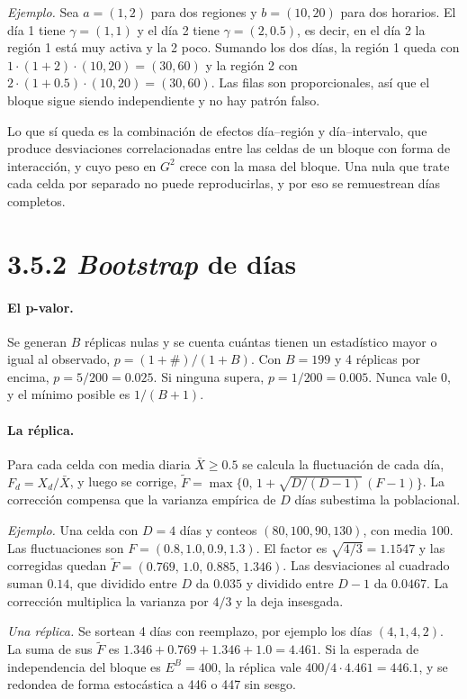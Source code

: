 \documentclass[11pt,a4paper]{article}
\begin{document}
\emph{Ejemplo.} Sea $a=(1,2)$ para dos regiones y $b=(10,20)$ para dos horarios. El
día 1 tiene $\gamma=(1,1)$ y el día 2 tiene $\gamma=(2,0.5)$, es decir, en el día 2 la
región 1 está muy activa y la 2 poco. Sumando los dos días, la región 1 queda con
$1\cdot(1+2)\cdot(10,20)=(30,60)$ y la región 2 con $2\cdot(1+0.5)\cdot(10,20)=(30,60)$.
Las filas son proporcionales, así que el bloque sigue siendo independiente y no hay
patrón falso.

Lo que sí queda es la combinación de efectos día--región y día--intervalo, que
produce desviaciones correlacionadas entre las celdas de un bloque con forma de
interacción, y cuyo peso en $G^2$ crece con la masa del bloque. Una nula que trate
cada celda por separado no puede reproducirlas, y por eso se remuestrean días
completos.

\section{3.5.2 \emph{Bootstrap} de días}

\paragraph{El p-valor.} Se generan $B$ réplicas nulas y se cuenta cuántas tienen un
estadístico mayor o igual al observado, $p=(1+\#)/(1+B)$. Con $B=199$ y 4 réplicas
por encima, $p=5/200=0.025$. Si ninguna supera, $p=1/200=0.005$. Nunca vale 0, y
el mínimo posible es $1/(B+1)$.

\paragraph{La réplica.} Para cada celda con media diaria $\bar X\ge0.5$ se calcula
la fluctuación de cada día, $F_d=X_d/\bar X$, y luego se corrige,
$\tilde F=\max\{0,\,1+\sqrt{D/(D-1)}\,(F-1)\}$. La corrección compensa que la
varianza empírica de $D$ días subestima la poblacional.

\emph{Ejemplo.} Una celda con $D=4$ días y conteos $(80,100,90,130)$, con media 100.
Las fluctuaciones son $F=(0.8,1.0,0.9,1.3)$. El factor es $\sqrt{4/3}=1.1547$ y las
corregidas quedan $\tilde F=(0.769,\,1.0,\,0.885,\,1.346)$. Las desviaciones al
cuadrado suman $0.14$, que dividido entre $D$ da $0.035$ y dividido entre $D-1$ da
$0.0467$. La corrección multiplica la varianza por $4/3$ y la deja insesgada.

\emph{Una réplica.} Se sortean 4 días con reemplazo, por ejemplo los días
$(4,1,4,2)$. La suma de sus $\tilde F$ es $1.346+0.769+1.346+1.0=4.461$. Si la
esperada de independencia del bloque es $E^B=400$, la réplica vale
$400/4\cdot4.461=446.1$, y se redondea de forma estocástica a 446 o 447 sin sesgo.
\end{document}
